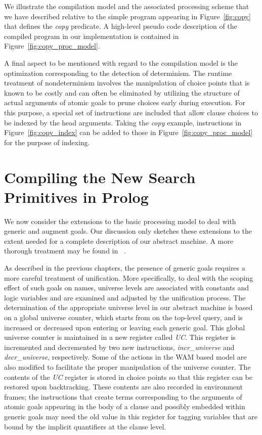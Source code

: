 We illustrate the compilation model and the associated processing
scheme that we have described relative to the simple  program
appearing in Figure~\ref{fig:copy} that defines the {\it copy}
predicate. A high-level pseudo code description of the compiled
program in our implementation is contained in
Figure~\ref{fig:copy_proc_model}.

A final aspect to be mentioned with regard to the compilation model is
the optimization corresponding to the detection of determinism.
The runtime treatment of nondeterminism involves the manipulation of choice
points that is known to be costly and can often be eliminated by
utilizing the structure of actual arguments of atomic goals to prune choices
early during execution. For this purpose, a special set of instructions are
included that allow clause choices to be indexed by the head arguments.
Taking the {\it copy} example, instructions in Figure~\ref{fig:copy_index} can
be added to those in Figure~\ref{fig:copy_proc_model} for the purpose of
indexing.

\section{Compiling the New Search Primitives in Prolog}\label{sec:ho_control}
We now consider the extensions to the basic processing model to deal
with generic and augment goals. Our discussion only sketches these
extensions to the extent needed for a complete description of our
abstract machine. A more thorough treatment may be found in
~\cite{NJK95lp}.

As described in the previous chapters, the presence of generic goals
requires a more careful treatment of unification. More specifically,
to deal with the scoping effect of such goals on names, universe
levels are associated with constants and logic variables and are
examined and adjusted by the unification process. The determination of
the appropriate universe level in our abstract machine is based on a
global universe counter, which starts from  on the top-level query,
and is increased or  decreased upon entering or leaving each generic
goal. This global universe counter is maintained in a new
register called {\it UC}. This register is incremented and decremented
by two new instructions, {\it incr\_universe} and {\it decr\_universe},
respectively.
Some of the actions in the WAM based model are also modified to
facilitate the proper manipulation of the universe counter.
The contents of the {\it UC} register is stored
in choice points so that this register can be restored upon
backtracking. These contents are also recorded in environment frames;
the instructions that create terms corresponding to the arguments of
atomic goals appearing in the body of a clause and possibly embedded
within generic goals may need the old value in this register for
tagging variables that are bound by the implicit quantifiers at the
clause level.

